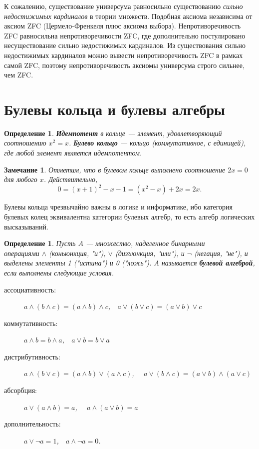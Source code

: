 \documentclass[12pt]{book}
\theoremstyle{upshape}
\newtheorem{zadacha}{Задача}[chapter]
\theoremstyle{generic}
\newtheorem{opredelenie}[teorema]{Определение}
\newtheorem{remark}[teorema]{Замечание}
\def\замечание{\begin{remark}}
\def\еза{\end{remark}}
\theoremstyle{upshapenonumber}
\newcommand{\следствие}{%
     \refstepcounter{teorema}
     {\noindent\bf Следствие \thechapter.\arabic{teorema}:\ }}
\newcommand{\пример}{%
     \refstepcounter{teorema}
     {\noindent\bf Пример \thechapter.\arabic{teorema}:\ }}
\newcommand{\лемма}{%
     \refstepcounter{teorema}
     {\noindent\bf Лемма \thechapter.\arabic{teorema}:\ }}
\newcommand{\теорема}{%
     \refstepcounter{teorema}
     {\noindent\bf Теорема \thechapter.\arabic{teorema}:\ }}
\newcommand{\утверждение}{%
     \refstepcounter{teorema}
     {\noindent\bf Утверждение \thechapter.\arabic{teorema}:\ }}
\def\бф{\bf}
\def\ем{\em}
\def\задача{\begin{zadacha}}
\def\ез{\end{zadacha}}
\def\еу{\end{ukazanie}}
\def\определение{\begin{opredelenie}}
\def\ео{\end{opredelenie}}
\def\енум{\begin{enumerate}}
\def\ее{\end{enumerate}}
\begin{document}
К сожалению, существование универсума 
равносильно существованию {\ем сильно недостижимых кардиналов}
в теории множеств. Подобная аксиома независима
от аксиом ZFC (Цермело-Френкеля плюс аксиома выбора).
Непротиворечивость ZFC  равносильна непротиворечивости 
ZFC, где дополнительно постулировано несуществование сильно
недостижимых кардиналов. Из существования сильно
недостижимых кардиналов можно вывести 
непротиворечивость ZFC в рамках самой ZFC,
поэтому непротиворечивость аксиомы универсума 
строго сильнее, чем ZFC.




\section{Булевы кольца и булевы алгебры}


\определение
{\бф Идемпотент} в кольце --- элемент, удовлетворяющий 
соотношению $x^2=x$.
{\бф Булево кольцо} --- кольцо (коммутативное, с единицей),
где любой элемент является идемпотентом.
\ео

\замечание
Отметим, что в булевом кольце выполнено соотношение
$2x=0$ для любого $x$.  Действительно,
\[
  0 = (x+1)^2 -x-1 = (x^2-x) + 2x = 2x.
\]
\еза

Булевы кольца чрезвычайно важны в логике и информатике,
ибо категория булевых колец эквивалентна категории булевых алгебр,
то есть алгебр логических высказываний.

\определение
Пусть $A$ --- множество, наделенное бинарными \\ операциями
$\land$ (коньюнкция, "и"), $\lor$ (дизъюнкция, "или"),
и $\lnot$ (негация, "не"), и выделены элементы
1 ("истина") и 0 ("ложь"). $A$ называется {\бф булевой
алгеброй}, если выполнены следующие условия.

\begin{description}
\item[ассоциативность:] $a\land (b\land c)= (a\land b)\land c$,\ \  
$a\lor (b\lor c)= (a\lor b)\lor c$
\item[коммутативность:] $a\land b=b\land a$,\ \  $a\lor b=b\lor a$ 
\item[дистрибутивность:] $a\land (b\lor c) =(a\land  b) \lor (a\land c)$, \ \ 
$a\lor (b\land c) =(a\lor  b) \land (a\lor c)$
\item[абсорбция:] $a\lor (a\land b) = a$, \ \ $a\land (a\lor b) = a$
\item[дополнительность:] $a\lor \lnot a = 1$,\ \  $a\land \lnot a = 0$.
\end{description}
\ео
\end{document}
